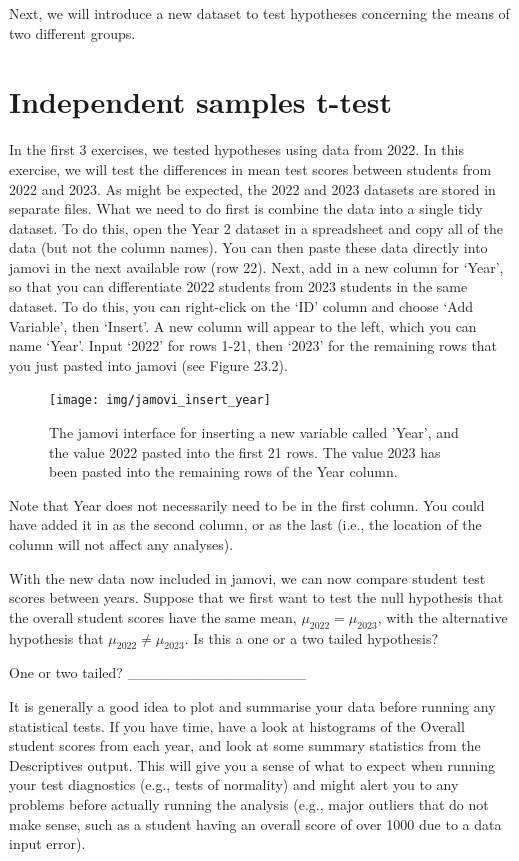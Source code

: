 \documentclass[
  openany]{scrbook}
\begin{document}
Next, we will introduce a new dataset to test hypotheses concerning the means of two different groups.

\hypertarget{independent-samples-t-test-1}{%
\section{Independent samples t-test}\label{independent-samples-t-test-1}}

In the first 3 exercises, we tested hypotheses using data from 2022.
In this exercise, we will test the differences in mean test scores between students from 2022 and 2023.
As might be expected, the 2022 and 2023 datasets are stored in separate files.
What we need to do first is combine the data into a single tidy dataset.
To do this, open the Year 2 dataset in a spreadsheet and copy all of the data (but not the column names).
You can then paste these data directly into jamovi in the next available row (row 22).
Next, add in a new column for `Year', so that you can differentiate 2022 students from 2023 students in the same dataset.
To do this, you can right-click on the `ID' column and choose `Add Variable', then `Insert'.
A new column will appear to the left, which you can name `Year'.
Input `2022' for rows 1-21, then `2023' for the remaining rows that you just pasted into jamovi (see Figure 23.2).

\begin{figure}
\texttt{[image: img/jamovi\_insert\_year]} \caption{The jamovi interface for inserting a new variable called 'Year', and the value 2022 pasted into the first 21 rows. The value 2023 has been pasted into the remaining rows of the Year column.}\label{fig:unnamed-chunk-90}
\end{figure}

Note that Year does not necessarily need to be in the first column.
You could have added it in as the second column, or as the last (i.e., the location of the column will not affect any analyses).

With the new data now included in jamovi, we can now compare student test scores between years.
Suppose that we first want to test the null hypothesis that the overall student scores have the same mean, \(\mu_{2022} = \mu_{2023}\), with the alternative hypothesis that \(\mu_{2022} \neq \mu_{2023}\).
Is this a one or a two tailed hypothesis?

One or two tailed? \_\_\_\_\_\_\_\_\_\_\_\_\_\_\_\_\_

It is generally a good idea to plot and summarise your data before running any statistical tests.
If you have time, have a look at histograms of the Overall student scores from each year, and look at some summary statistics from the Descriptives output.
This will give you a sense of what to expect when running your test diagnostics (e.g., tests of normality) and might alert you to any problems before actually running the analysis (e.g., major outliers that do not make sense, such as a student having an overall score of over 1000 due to a data input error).
\end{document}
